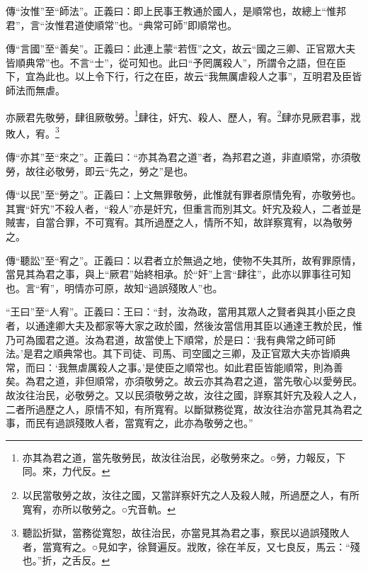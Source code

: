 {\noindent\zhuan{}\fzbyks 傳“汝惟”至“師法”。正義曰：即上民事王教通於國人，是順常也，故總上“惟邦君”，言“汝惟君道使順常”也。“典常可師”即順常也。 \par}

{\noindent\zhuan{}\fzbyks 傳“言國”至“善矣”。正義曰：此連上蒙“若恆”之文，故云“國之三卿、正官眾大夫皆順典常”也。不言“士”，從可知也。此曰“予罔厲殺人”，所謂令之語，但在臣下，宜為此也。以上令下行，行之在臣，故云“我無厲虐殺人之事”，互明君及臣皆師法而無虐。 \par}

亦厥君先敬勞，肆徂厥敬勞。\footnote{亦其為君之道，當先敬勞民，故汝往治民，必敬勞來之。○勞，力報反，下同。來，力代反。}肆往，奸宄、殺人、歷人，宥。\footnote{以民當敬勞之故，汝往之國，又當詳察奸宄之人及殺人賊，所過歷之人，有所寬宥，亦所以敬勞之。○宄音軌。}肆亦見厥君事，戕敗人，宥。\footnote{聽訟折獄，當務從寬恕，故往治民，亦當見其為君之事，察民以過誤殘敗人者，當寬宥之。○見如字，徐賢遍反。戕敗，徐在羊反，又七良反，馬云：“殘也。”折，之舌反。}

{\noindent\zhuan{}\fzbyks 傳“亦其”至“來之”。正義曰：“亦其為君之道”者，為邦君之道，非直順常，亦須敬勞，故往必敬勞，即云“先之，勞之”是也。 \par}

{\noindent\zhuan{}\fzbyks 傳“以民”至“勞之”。正義曰：上文無罪敬勞，此惟就有罪者原情免宥，亦敬勞也。其實“奸宄”不殺人者，“殺人”亦是奸宄，但重言而別其文。奸宄及殺人，二者並是賊害，自當合罪，不可寬宥。其所過歷之人，情所不知，故詳察寬宥，以為敬勞之。 \par}

{\noindent\zhuan{}\fzbyks 傳“聽訟”至“宥之”。正義曰：以君者立於無過之地，使物不失其所，故宥罪原情，當見其為君之事，與上“厥君”始終相承。於“奸”上言“肆往”，此亦以罪事往可知也。言“宥”，明情亦可原，故知“過誤殘敗人”也。 \par}

{\noindent\shu{}\fzkt “王曰”至“人宥”。正義曰：王曰：“封，汝為政，當用其眾人之賢者與其小臣之良者，以通達卿大夫及都家等大家之政於國，然後汝當信用其臣以通達王教於民，惟乃可為國君之道。汝為君道，故當使上下順常，於是曰：‘我有典常之師可師法。’是君之順典常也。其下司徒、司馬、司空國之三卿，及正官眾大夫亦皆順典常，而曰：‘我無虐厲殺人之事。’是使臣之順常也。如此君臣皆能順常，則為善矣。為君之道，非但順常，亦須敬勞之。故云亦其為君之道，當先敬心以愛勞民。故汝往治民，必敬勞之。又以民須敬勞之故，汝往之國，詳察其奸宄及殺人之人，二者所過歷之人，原情不知，有所寬宥。以斷獄務從寬，故汝往治亦當見其為君之事，而民有過誤殘敗人者，當寬宥之，此亦為敬勞之也。” \par}

